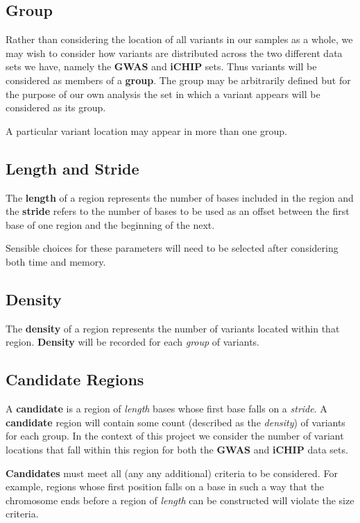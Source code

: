 \subsection{Group}

Rather than considering the location of all variants in our samples as a whole,
we may wish to consider how variants are distributed across the two different
data sets we have, namely the \textbf{GWAS} and \textbf{iCHIP} sets. Thus variants
will be considered as members of a \textbf{group}. The group may be
arbitrarily defined but for the purpose of our own analysis the set in which a
variant appears will be considered as its group.

A particular variant location may appear in more than one group.


\subsection{Length and Stride}
\label{sec:lengthstride}

The \textbf{length} of a region represents the number of bases included in the
region and the \textbf{stride} refers to the number of bases to be used as an
offset between the first base of one region and the beginning of the next.

Sensible choices for these parameters will need to be selected after considering
both time and memory.


\subsection{Density}

The \textbf{density} of a region represents the number of variants located
within that region. \textbf{Density} will be recorded for each \textit{group} of
variants.


\subsection{Candidate Regions}

A \textbf{candidate} is a region of \textit{length} bases whose first base falls
on a \textit{stride}. A \textbf{candidate} region will contain some count
(described as the \textit{density}) of variants for each group. In the context
of this project we consider the number of variant locations that fall within
this region for both the \textbf{GWAS} and \textbf{iCHIP} data sets.

\textbf{Candidates} must meet all (any any additional) criteria to be considered.
For example, regions whose first position falls on a base in such a way that the
chromosome ends before a region of \textit{length} can be constructed will
violate the size criteria.

